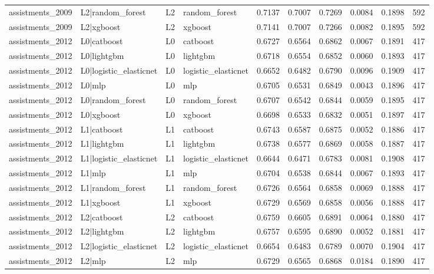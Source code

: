\begin{table}
\begin{tabular}{llllrrrrrr}
assistments\_2009 & L2|random\_forest & L2 & random\_forest & 0.7137 & 0.7007 & 0.7269 & 0.0084 & 0.1898 & 592 \\
assistments\_2009 & L2|xgboost & L2 & xgboost & 0.7141 & 0.7007 & 0.7266 & 0.0082 & 0.1895 & 592 \\
assistments\_2012 & L0|catboost & L0 & catboost & 0.6727 & 0.6564 & 0.6862 & 0.0067 & 0.1891 & 417 \\
assistments\_2012 & L0|lightgbm & L0 & lightgbm & 0.6718 & 0.6554 & 0.6852 & 0.0060 & 0.1893 & 417 \\
assistments\_2012 & L0|logistic\_elasticnet & L0 & logistic\_elasticnet & 0.6652 & 0.6482 & 0.6790 & 0.0096 & 0.1909 & 417 \\
assistments\_2012 & L0|mlp & L0 & mlp & 0.6705 & 0.6531 & 0.6849 & 0.0043 & 0.1896 & 417 \\
assistments\_2012 & L0|random\_forest & L0 & random\_forest & 0.6707 & 0.6542 & 0.6844 & 0.0059 & 0.1895 & 417 \\
assistments\_2012 & L0|xgboost & L0 & xgboost & 0.6698 & 0.6533 & 0.6832 & 0.0051 & 0.1897 & 417 \\
assistments\_2012 & L1|catboost & L1 & catboost & 0.6743 & 0.6587 & 0.6875 & 0.0052 & 0.1886 & 417 \\
assistments\_2012 & L1|lightgbm & L1 & lightgbm & 0.6738 & 0.6577 & 0.6869 & 0.0058 & 0.1887 & 417 \\
assistments\_2012 & L1|logistic\_elasticnet & L1 & logistic\_elasticnet & 0.6644 & 0.6471 & 0.6783 & 0.0081 & 0.1908 & 417 \\
assistments\_2012 & L1|mlp & L1 & mlp & 0.6704 & 0.6538 & 0.6844 & 0.0067 & 0.1893 & 417 \\
assistments\_2012 & L1|random\_forest & L1 & random\_forest & 0.6726 & 0.6564 & 0.6858 & 0.0069 & 0.1888 & 417 \\
assistments\_2012 & L1|xgboost & L1 & xgboost & 0.6729 & 0.6569 & 0.6858 & 0.0056 & 0.1888 & 417 \\
assistments\_2012 & L2|catboost & L2 & catboost & 0.6759 & 0.6605 & 0.6891 & 0.0064 & 0.1880 & 417 \\
assistments\_2012 & L2|lightgbm & L2 & lightgbm & 0.6757 & 0.6595 & 0.6890 & 0.0052 & 0.1881 & 417 \\
assistments\_2012 & L2|logistic\_elasticnet & L2 & logistic\_elasticnet & 0.6654 & 0.6483 & 0.6789 & 0.0070 & 0.1904 & 417 \\
assistments\_2012 & L2|mlp & L2 & mlp & 0.6729 & 0.6565 & 0.6868 & 0.0184 & 0.1890 & 417 \\

\end{tabular}
\end{table}
